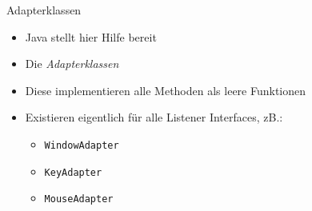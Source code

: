 \begin{frame}{Adapterklassen}{}
    \begin{itemize}
        \item Java stellt hier Hilfe bereit
        \item Die \textit{Adapterklassen}
        \item Diese implementieren alle Methoden als leere Funktionen
        \item Existieren eigentlich für alle Listener Interfaces, zB.:
        \begin{itemize}
            \item \texttt{WindowAdapter}
            \item \texttt{KeyAdapter}
            \item \texttt{MouseAdapter}
        \end{itemize}
    \end{itemize}
\end{frame}